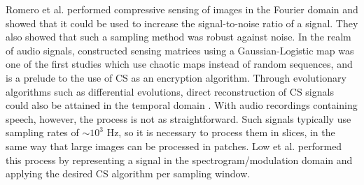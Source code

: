 \documentclass[10pt,a4paper,twoside]{article}
\begin{document}
Romero et al. \cite{Romero2016,Romero2018} performed compressive sensing of images in the Fourier domain and showed that it could be used to increase the signal-to-noise ratio of a signal. They also showed that such a sampling method was robust against noise. In the realm of audio signals,  \cite{Mathew2016} constructed sensing matrices using a Gaussian-Logistic map was one of the first studies which use chaotic maps instead of random sequences, and is a prelude to the use of CS as an encryption algorithm. Through evolutionary algorithms such as differential evolutions, direct reconstruction of CS signals could also be attained in the temporal domain \cite{Andras2018}. With audio recordings containing speech, however, the process is not as straightforward. Such signals typically use sampling rates of $\sim 10^{3}$ Hz, so it is necessary to process them in slices, in the same way that large images can be processed in patches. Low et al. \cite{Low2018} performed this process by representing a signal in the spectrogram/modulation domain and applying the desired CS algorithm per sampling window.
\end{document}
